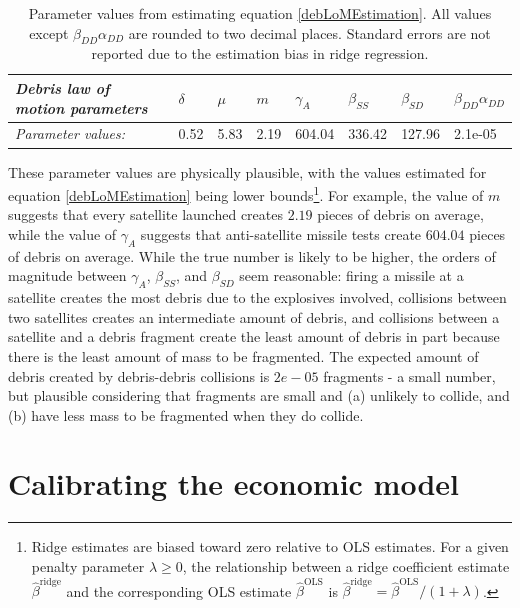 \documentclass[12pt]{article}
\begin{document}
\begin{table}[H]
	\begin{tabular}{|l|l|l|l|l|l|l|l|}
		\hline
		\textit{Debris law of motion parameters} & \textbf{$\delta$} & \textbf{$\mu$} & \textbf{$m$} & \textbf{$\gamma_A$} & \textbf{$\beta_{SS}$} & \textbf{$\beta_{SD}$} & \textbf{$\beta_{DD}\alpha_{DD}$} \\ \hline
		\textit{Parameter values:}                           & 0.52              & 5.83           & 2.19         & 604.04              & 336.42                & 127.96                & 2.1e-05                          \\ \hline
	\end{tabular}
		\caption{Parameter values from estimating equation \ref{debLoMEstimation}. All values except $\beta_{DD}\alpha_{DD}$ are rounded to two decimal places. Standard errors are not reported due to the estimation bias in ridge regression.}
		\label{debParms}
\end{table}

These parameter values are physically plausible, with the values estimated for equation \ref{debLoMEstimation} being lower bounds\footnote{Ridge estimates are biased toward zero relative to OLS estimates. For a given penalty parameter $\lambda \geq 0$, the relationship between a ridge coefficient estimate $\hat{\beta}^{\text{ridge}}$ and the corresponding OLS estimate $\hat{\beta}^{\text{OLS}}$ is $\hat{\beta}^{\text{ridge}} = \hat{\beta}^{\text{OLS}}/(1+\lambda)$.}. For example, the value of $m$ suggests that every satellite launched creates $2.19$ pieces of debris on average, while the value of $\gamma_A$ suggests that anti-satellite missile tests create $604.04$ pieces of debris on average. While the true number is likely to be higher, the orders of magnitude between $\gamma_A$, $\beta_{SS}$, and $\beta_{SD}$ seem reasonable: firing a missile at a satellite creates the most debris due to the explosives involved, collisions between two satellites creates an intermediate amount of debris, and collisions between a satellite and  a debris fragment create the least amount of debris in part because there is the least amount of mass to be fragmented. The expected amount of debris created by debris-debris collisions is $2e-05$ fragments - a small number, but plausible considering that fragments are small and (a) unlikely to collide, and (b) have less mass to be fragmented when they do collide.

\section*{Calibrating the economic model}
\end{document}
